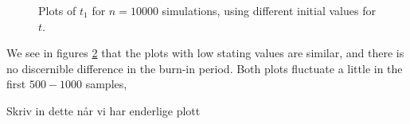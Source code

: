 \begin{figure}[h]
\begin{subfigure}[b]{0.49\textwidth}
        \label{fig:sim_t_diff_start_90}
    \end{subfigure}
    \caption{Plots of $t_1$ for $n = 10000$ simulations, using different initial values for $t$.}
    \label{fig:sim_t_diff_start}
\end{figure}

We see in figures \ref{fig:sim_t_diff_start} that the plots with low stating values are similar, and there is no discernible difference in the burn-in period. Both plots fluctuate a little in the first $500-1000$ samples,

Skriv in dette når vi har enderlige plott



